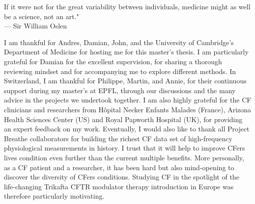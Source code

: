 \cleardoublepage
\thispagestyle{empty}


\vspace*{3cm}

\begin{raggedleft}
    	If it were not for the great variability between individuals, medicine might as well be a science, not an art." \\ \hfill \break
     --- Sir William Oslen\\
\end{raggedleft}

\vspace{4cm}

I am thankful for Andres, Damian, John, and the University of Cambridge's Department of Medicine for hosting me for this master's thesis. I am particularly grateful for Damian for the excellent supervision, for sharing a thorough reviewing mindset and for accompanying me to explore different methods. In Switzerland, I am thankful for Philippe, Martin, and Annie, for their continuous support during my master's at EPFL, through our discussions and the many advice in the projects we undertook together. I am also highly grateful for the CF clinicians and researchers from Hôpital Necker Enfants Malades (France), Arizona Health Sciences Center (US) and Royal Papworth Hospital (UK), for providing an expert feedback on my work. Eventually, I would also like to thank all Project Breathe collaborators for building the richest CF data set of high-frequency physiological measurements in history. I trust that it will help to improve CFers lives condition even further than the current multiple benefits. More personally, as a CF patient and a researcher, it has been hard but also mind-opening to discover the diversity of CFers conditions. Studying CF in the spotlight of the life-changing Trikafta CFTR modulator therapy introduction in Europe was therefore particularly motivating.